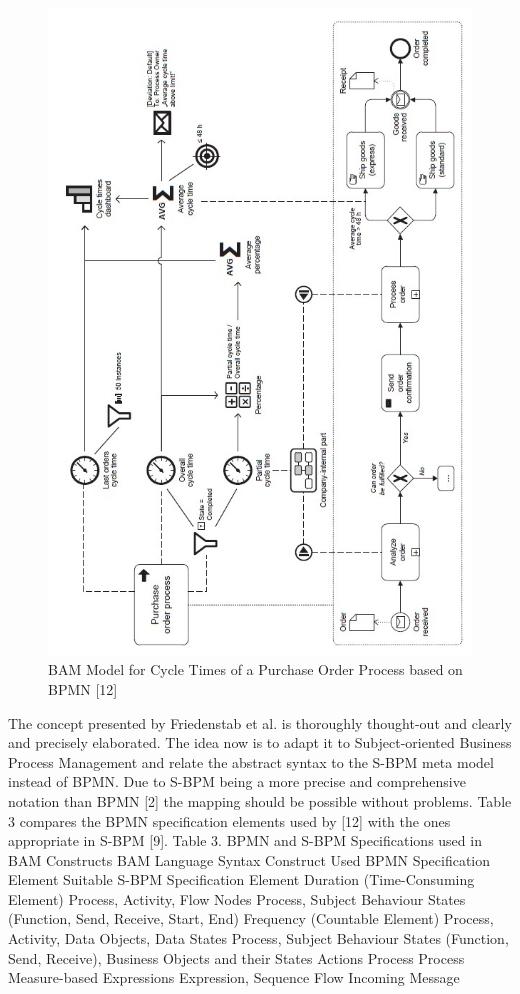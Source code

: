 \begin{figure}[h]
	\centering
	\includegraphics[width=0.9\linewidth]{Figures/Chapter5/BAM Model for Cycle Times.jpg}
	\caption[BAM Model for Cycle Times of a Purchase Order Process based on BPMN 12]{BAM Model for Cycle Times of a Purchase Order Process based on BPMN [12]}
	\label{fig:Model-Cycle-Times}
\end{figure}


The concept presented by Friedenstab et al. is thoroughly thought-out and clearly and precisely elaborated. The idea now is to adapt it to Subject-oriented Business Process Management and relate the abstract syntax to the S-BPM meta model instead of BPMN. Due to S-BPM being a more precise and comprehensive notation than BPMN [2] the mapping should be possible without problems. Table 3 compares the BPMN specification elements used by [12] with the ones appropriate in S-BPM [9].
Table 3.  BPMN and S-BPM Specifications used in BAM Constructs
BAM Language Syntax Construct	Used BPMN Specification Element 	Suitable S-BPM Specification Element 
Duration
(Time-Consuming Element)	Process, Activity, Flow Nodes	Process, Subject Behaviour States (Function, Send, Receive, Start, End)
Frequency
(Countable Element)	Process, Activity, Data Objects, Data States	Process, Subject Behaviour States (Function, Send, Receive), Business Objects and their States
Actions	Process	Process
Measure-based Expressions	Expression, Sequence Flow	Incoming Message

